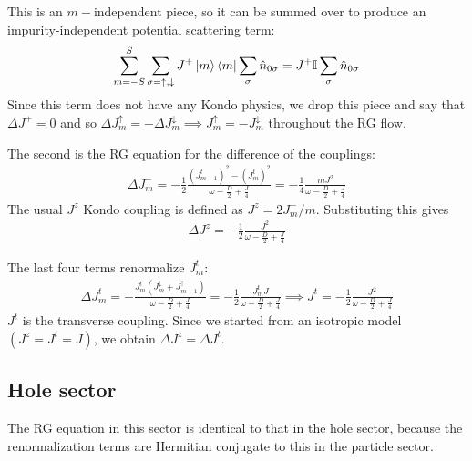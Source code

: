 \documentclass[12pt]{revtex4-2}
\begin{document}
This is an \(m-\)independent piece, so it can be summed over to produce an impurity-independent potential scattering term:
\begin{equation}\begin{aligned}
	\sum_{m=-S}^S \sum_{\sigma=\uparrow,\downarrow} J^+ \ket{m}\bra{m} \sum_\sigma \hat n_{0\sigma} = J^+ \mathbb{I}\sum_\sigma \hat n_{0\sigma}
\end{aligned}\end{equation}
Since this term does not have any Kondo physics, we drop this piece and say that \(\Delta J^+ = 0\) and so \(\Delta J^\uparrow_m = - \Delta J^\downarrow_m \implies J^\uparrow_m = -J^\downarrow_m\) throughout the RG flow.

The second is the RG equation for the difference of the couplings:
\begin{equation}\begin{aligned}
	\Delta J^-_m = -\frac{1}{2}\frac{\left( J^t_{m-1} \right) ^2 - \left(J^t_{m}\right) ^2}{\omega - \frac{D}{2} + \frac{J}{4}} = -\frac{1}{4}\frac{m J^2}{\omega - \frac{D}{2} + \frac{J}{4}}
\end{aligned}\end{equation}
The usual \(J^z\) Kondo coupling is defined as \(J^z = 2J^-_m/m\). Substituting this gives 
\begin{equation}\begin{aligned}
	\Delta J^z = -\frac{1}{2}\frac{J^2}{\omega - \frac{D}{2} + \frac{J}{4}}
\end{aligned}\end{equation}

The last four terms renormalize \(J^t_m\):
\begin{equation}\begin{aligned}
	\Delta J^t_m = - \frac{J^t_m \left( J^\downarrow_m + J^\uparrow_{m+1} \right) }{\omega - \frac{D}{2} + \frac{J}{4}} = -\frac{1}{2}\frac{J^t_m J}{\omega - \frac{D}{2} + \frac{J}{4}} \implies J^t = -\frac{1}{2}\frac{J^2}{\omega - \frac{D}{2} + \frac{J}{4}}
\end{aligned}\end{equation}
\(J^t\) is the transverse coupling. Since we started from an isotropic model \(\left( J^z = J^t= J \right) \), we obtain \(\Delta J^z = \Delta J^t\).

\subsection{Hole sector}
The RG equation in this sector is identical to that in the hole sector, because the renormalization terms are Hermitian conjugate to this in the particle sector.



\end{document}
